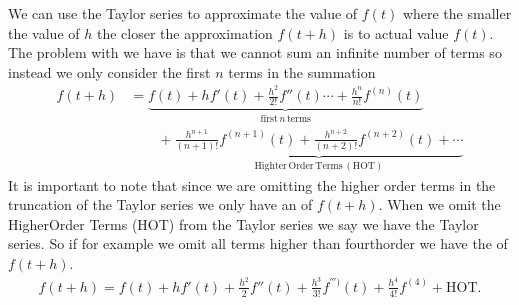 \documentclass[letterpaper,10pt,english]{jupyterBook}
\begin{document}
\sphinxAtStartPar
We can use the Taylor series to approximate the value of \(f(t)\) where the smaller the value of \(h\) the closer the approximation \(f(t+h)\) is to actual value \(f(t)\). The problem with we have is that we cannot sum an infinite number of terms so instead we only consider the first \(n\) terms in the summation
\begin{align*}
    f(t+h) &= \underbrace{f(t) + hf'(t) + \frac{h^2}{2!}f''(t) \cdots + \frac{h^n}{n!}f^{(n)}(t)}_{\mathrm{first }\,n\,\mathrm{ terms}} \\
    & \qquad + \underbrace{\frac{h^{n+1}}{(n+1)!}f^{(n+1)}(t) + \frac{h^{n+2}}{(n+2)!}f^{(n+2)}(t) + \cdots}_{\mathrm{Highter\,Order\,Terms \,(HOT)}}
\end{align*}
\sphinxAtStartPar
It is important to note that since we are omitting the higher order terms in the truncation of the Taylor series we only have an  of \(f(t+h)\). When we omit the Higher\sphinxhyphen{}Order Terms (HOT) from the Taylor series we say we have  the Taylor series. So if for example we omit all terms higher than fourth\sphinxhyphen{}order we have the  of \(f(t+h)\).
\begin{equation*}
\begin{split}f(t+h) = f(t) + hf' (t)+\frac{h^2}{2}f'' (t) + \frac{h^3}{3!}f^{''')}(t) + \frac{h^4}{4!}f^{(4)} + \mathrm{HOT}.\end{split}
\end{equation*}
\end{document}
